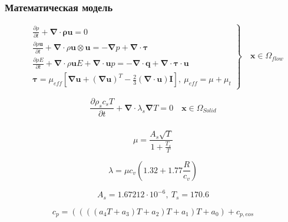 \documentclass[10pt,xcolor={dvipsnames,table},aspectratio=169]{beamer}
\begin{document}
    \begin{frame}{}

        \justifying
        \normalsize

        \frametitle{Математическая модель}

        \[
            \left.
            \begin{aligned}
                &\frac{\partial \rho}{\partial t}
                + \symbf{\nabla} \cdot \symbf{\rho u} = 0 \\
                &\frac{\partial \rho \symbf{u}}{\partial t}
                + \symbf{\nabla} \cdot \rho \symbf{u} \otimes \symbf{u}
                =
                - \symbf{\nabla} p
                + \symbf{\nabla} \cdot \symbf{\tau}\\
                &\frac{\partial \rho E}{\partial t}
                + \symbf{\nabla} \cdot \rho \symbf{u} E
                + \symbf{\nabla} \cdot \symbf{u} p
                =
                - \symbf{\nabla} \cdot \symbf{q}
                + \symbf{\nabla} \cdot \symbf{\tau \cdot \symbf{u}}\\
                &\symbf{\tau} = \mu_{eff} \left[ \symbf{\nabla} \symbf{u} + \left( \symbf{\nabla} \symbf{u} \right) ^{T}  - \frac{2}{3} \left(  \symbf{\nabla} \cdot \symbf{u} \right) \symbf{I} \right], \: \mu_{eff} = \mu + \mu_{t}
            \end{aligned} \right\rbrace \quad \symbf{x} \in \Omega_{flow}
        \]

        \[
            \frac{\partial \rho_{s} c_{s} T}{\partial t} + \symbf{\nabla} \cdot \lambda_{s} \symbf{\nabla} T = 0 \quad \symbf{x} \in \Omega_{Solid}
        \]

    \end{frame}{}

    \begin{frame}{}

        \justifying
        \normalsize

        \frametitle{}

        \[
             \mu = \frac{A_{s} \sqrt{T}}{1 + \frac{T_{s}}{T}}
        \]

        \[
            \lambda = \mu c_{v} \left( 1.32 + 1.77 \frac{R}{c_{v}} \right)
        \]

        \[
            A_{s} = 1.67212 \cdot 10^{-6}, \: T_{s} = 170.6
        \]

        \[
            c_{p} = ((((a_{4} T + a_{3}) T + a_{2}) T + a_{1}) T + a_{0}) + c_{p, eos}
        \]

    \end{frame}{}
\end{document}
